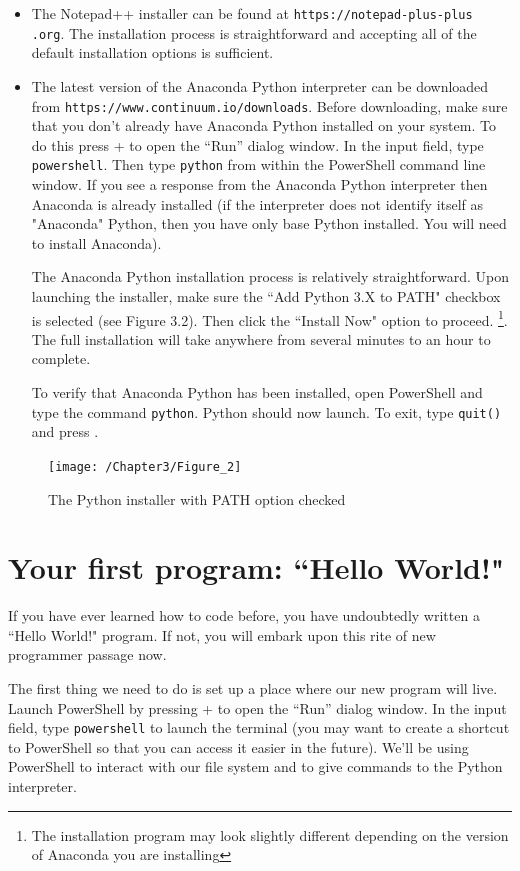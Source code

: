 \documentclass{book}
\begin{document}
\begin{itemize}
	\item The Notepad++ installer can be found at \texttt{https://notepad-plus-plus
		.org}. The installation process is straightforward and accepting all of the default installation options is sufficient.
	\item The latest version of the Anaconda Python interpreter can be downloaded from 
	\texttt{https://www.continuum.io/downloads}. Before downloading, make sure that you don't already have Anaconda Python installed on your system. To do this press  +  to open the ``Run'' dialog window. In the input field, type \texttt{powershell}. Then type \texttt{python} from within the PowerShell command line window. If you see a response from the Anaconda Python interpreter then Anaconda is already installed (if the interpreter does not identify itself as "Anaconda" Python, then you have only base Python installed. You will need to install Anaconda).
	
	The Anaconda Python installation process is relatively straightforward. Upon launching the installer, make sure the ``Add Python 3.X to PATH" checkbox is selected (see Figure 3.2). Then click the ``Install Now" option to proceed. \footnote{The installation program may look slightly different depending on the version of Anaconda you are installing}. The full installation will take anywhere from several minutes to an hour to complete. 
	
	To verify that Anaconda Python has been installed, open PowerShell and type the command \texttt{python}. Python should now launch. To exit, type \texttt{quit()} and press .
\end{itemize}

\begin{figure}[h]
	\caption{The Python installer with PATH option checked}
	\centering\texttt{[image: /Chapter3/Figure\_2]}
\end{figure}

\section{Your first program: ``Hello World!"}
If you have ever learned how to code before, you have undoubtedly written a ``Hello World!" program. If not, you will embark upon this rite of new programmer passage now.

The first thing we need to do is set up a place where our new program will live. Launch PowerShell by pressing  +  to open the ``Run'' dialog window. In the input field, type \texttt{powershell} to launch the terminal (you may want to create a shortcut to PowerShell so that you can access it easier in the future). We'll be using PowerShell to interact with our file system and to give commands to the Python interpreter.  
\end{document}
